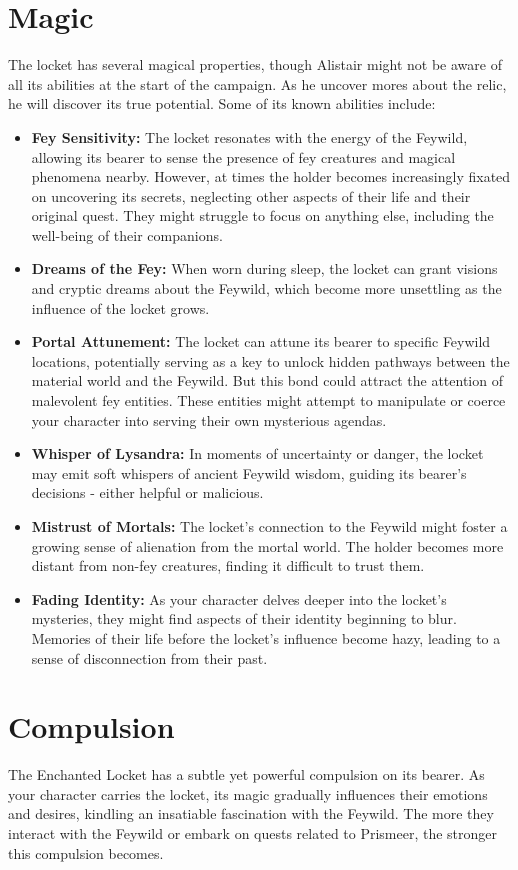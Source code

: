 \section*{Magic}
The locket has several magical properties, though Alistair might not be aware of all its abilities at the start of the campaign. As he uncover mores about the relic, he will discover its true potential. Some of its known abilities include:
\begin{itemize}
	\item \textbf{Fey Sensitivity:} The locket resonates with the energy of the Feywild, allowing its bearer to sense the presence of fey creatures and magical phenomena nearby. However, at times the holder becomes increasingly fixated on uncovering its secrets, neglecting other aspects of their life and their original quest. They might struggle to focus on anything else, including the well-being of their companions.
	\item \textbf{Dreams of the Fey:} When worn during sleep, the locket can grant visions and cryptic dreams about the Feywild, which become more unsettling as the influence of the locket grows.
	\item \textbf{Portal Attunement:} The locket can attune its bearer to specific Feywild locations, potentially serving as a key to unlock hidden pathways between the material world and the Feywild. But this bond could attract the attention of malevolent fey entities. These entities might attempt to manipulate or coerce your character into serving their own mysterious agendas.
	\item \textbf{Whisper of Lysandra:} In moments of uncertainty or danger, the locket may emit soft whispers of ancient Feywild wisdom, guiding its bearer's decisions - either helpful or malicious.
	\item \textbf{Mistrust of Mortals:} The locket's connection to the Feywild might foster a growing sense of alienation from the mortal world. The holder becomes more distant from non-fey creatures, finding it difficult to trust them.
	\item \textbf{Fading Identity:} As your character delves deeper into the locket's mysteries, they might find aspects of their identity beginning to blur. Memories of their life before the locket's influence become hazy, leading to a sense of disconnection from their past.
\end{itemize}
\section*{Compulsion}
The Enchanted Locket has a subtle yet powerful compulsion on its bearer. As your character carries the locket, its magic gradually influences their emotions and desires, kindling an insatiable fascination with the Feywild. The more they interact with the Feywild or embark on quests related to Prismeer, the stronger this compulsion becomes.

